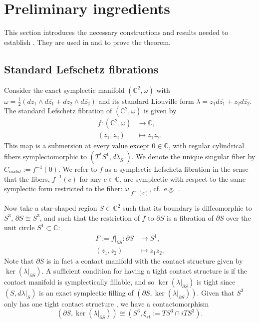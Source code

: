 \documentclass[10pt]{amsart}
\theoremstyle{plain}
\theoremstyle{definition}
\numberwithin{equation}{section}
\newcommand{\C}{\mathbb{C}}
\newcommand{\la}{\lambda}
\newcommand{\sse}{\subset}
\begin{document}
\section{Preliminary ingredients}\label{sec:setting}

This section introduces the necessary constructions and results needed to establish . They are used in  and  to prove the theorem.

\subsection{Standard Lefschetz fibrations}\label{sec:std_lef_fibr} Consider the exact symplectic manifold $(\C^2,\omega)$ with $\omega= \frac{i}{2}(dz_1\wedge d\overline{z_1}+dz_2\wedge d\overline{z_2})$ and its standard  Liouville form $\lambda=z_1d\overline{z_1}+z_2d\overline{z_2}$. The standard Lefschetz fibration of $(\C^2,\omega)$ is given by
\begin{align*}
f:(\C^2,\omega)&\to \C,\\
(z_1,z_2)&\mapsto z_1z_2.
\end{align*}
This map is a submersion at every value except $0\in \C$, with regular cylindrical fibers symplectomorphic to $(T^*S^1,d\la_{S^1})$. We denote the unique singular fiber by $C_{nodal}:=f^{-1}(0)$. We refer to $f$ as a symplectic Lefschetz fibration in the sense that the fibers, $f^{-1}(c)$ for any $c\in \C$, are symplectic with respect to the same symplectic form restricted to the fiber: $\omega|_{f^{-1}(c)}$, cf.~e.g.~\cite{McDuff17_IntroSympl}.

Now take a star-shaped region $S\sse \C^2$ such that its boundary is diffeomorphic to $S^3$, $\partial S \cong S^3$, and such that the restriction of $f$ to $\partial S$ is a fibration of $\partial S$ over the unit circle $S^1\sse \C$:
\begin{align*}
F:=f|_{\partial S}:\partial S&\to S^1,\\
(z_1,z_2)&\mapsto z_1z_2.
\end{align*}
Note that $\partial S$ is in fact a contact manifold with the contact structure given by $\ker (\lambda|_{\partial S})$. A sufficient condition for having a tight contact structure is if the contact manifold is symplectically fillable, and so $\ker (\lambda|_{\partial S})$ is tight since $(S,d\la|_S)$ is an exact symplectic filling of $(\partial S,\ker (\lambda|_{\partial S}))$. Given that $S^3$ only has one tight contact structure \cite{Eliashberg89_OvertwistedStructures}, we have a contactomorphism
$$(\partial S,\ker (\lambda|_{\partial S}))\cong (S^3,\xi_{st}:=TS^3\cap iTS^3).$$
\end{document}
